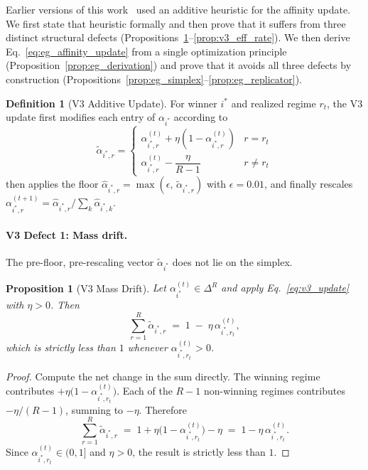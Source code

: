 \documentclass[11pt,a4paper]{article}
\theoremstyle{definition}
\newtheorem{definition}{Definition}[section]
\theoremstyle{plain}
\newtheorem{proposition}{Proposition}[section]
\begin{document}
Earlier versions of this work~\cite{li2026emergent} used an additive
heuristic for the affinity update. We first state that heuristic
formally and then prove that it suffers from three distinct structural
defects (Propositions~\ref{prop:v3_mass_drift}--\ref{prop:v3_eff_rate}).
We then derive Eq.~\eqref{eq:eg_affinity_update} from a single
optimization principle (Proposition~\ref{prop:eg_derivation}) and prove
that it avoids all three defects by construction
(Propositions~\ref{prop:eg_simplex}--\ref{prop:eg_replicator}).

\begin{definition}[V3 Additive Update]
\label{def:v3_update}
For winner $i^*$ and realized regime $r_t$, the V3 update first
modifies each entry of $\alpha_{i^*}$ according to
\begin{equation}
\label{eq:v3_update}
\tilde{\alpha}_{i^*,r} =
\begin{cases}
\alpha_{i^*,r}^{(t)} + \eta\!\left(1 - \alpha_{i^*,r}^{(t)}\right) & r = r_t \\[3pt]
\alpha_{i^*,r}^{(t)} - \dfrac{\eta}{R-1} & r \neq r_t
\end{cases}
\end{equation}
then applies the floor $\hat{\alpha}_{i^*,r} = \max\!\left(\epsilon,\, \tilde{\alpha}_{i^*,r}\right)$
with $\epsilon = 0.01$, and finally rescales
$\alpha_{i^*,r}^{(t+1)} = \hat{\alpha}_{i^*,r} / \sum_{k} \hat{\alpha}_{i^*,k}$.
\end{definition}

\paragraph{V3 Defect 1: Mass drift.}
The pre-floor, pre-rescaling vector $\tilde{\alpha}_{i^*}$ does not lie
on the simplex.

\begin{proposition}[V3 Mass Drift]
\label{prop:v3_mass_drift}
Let $\alpha_{i^*}^{(t)} \in \Delta^R$ and apply Eq.~\eqref{eq:v3_update}
with $\eta > 0$. Then
\begin{equation}
\label{eq:v3_premass}
\sum_{r=1}^{R} \tilde{\alpha}_{i^*,r}
\;=\;
1 \;-\; \eta\,\alpha_{i^*,r_t}^{(t)},
\end{equation}
which is strictly less than $1$ whenever $\alpha_{i^*,r_t}^{(t)} > 0$.
\end{proposition}

\begin{proof}
Compute the net change in the sum directly. The winning regime contributes
$+\eta\bigl(1 - \alpha_{i^*,r_t}^{(t)}\bigr)$. Each of the $R-1$ non-winning
regimes contributes $-\eta/(R-1)$, summing to $-\eta$. Therefore
\[
\sum_{r=1}^{R} \tilde{\alpha}_{i^*,r}
\;=\; 1 + \eta\bigl(1 - \alpha_{i^*,r_t}^{(t)}\bigr) - \eta
\;=\; 1 - \eta\,\alpha_{i^*,r_t}^{(t)}.
\]
Since $\alpha_{i^*,r_t}^{(t)} \in (0,1]$ and $\eta > 0$, the result is
strictly less than $1$.
\end{proof}
\end{document}
